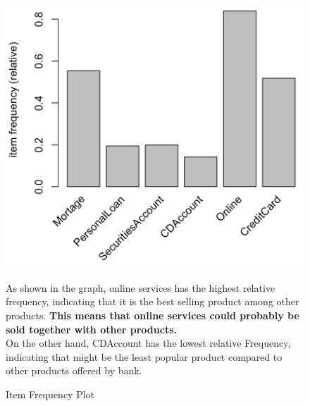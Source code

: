 \documentclass[]{article}
\begin{document}
\begin{figure}[H]
	\centering
	\begin{minipage}{0.28\textwidth}
	\centering
		\includegraphics{tem_files/figure-latex/shopbasket-4.png}
		\caption{Item Frequency Plot}
	\end{minipage}
	\hspace{1cm}
	\begin{minipage}{0.60\textwidth}
As shown in the graph, online services has the highest relative frequency, indicating that it is the best selling product among other products. \textbf{This means that online services could probably be sold together with other products.}\\ 
On the other hand, CDAccount has the lowest relative Frequency, indicating that might be the least popular product compared to other products offered by bank.
	\end{minipage}
\end{figure}
\end{document}
